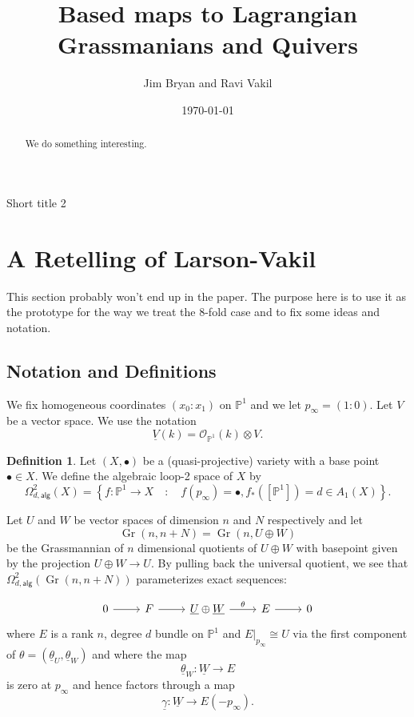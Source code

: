 \documentclass{amsart}
\title{Based maps to Lagrangian Grassmanians and Quivers}
\author{Jim Bryan and Ravi Vakil}
\date{\today}
\theoremstyle{definition}
\newtheorem{definition}[theorem]{Definition}
\newcommand{\PP}{\mathbb{P}}
\newcommand{\OO}{\mathcal{O}}
\newcommand{\UL}[1]{\underline{#1}}
\newcommand{\alg}{\mathsf{alg}}
\newcommand{\Gr}{\operatorname{Gr}}
\newcommand{\LoopTwo}{\Omega^{2}_{d,\alg}}
\begin{document}
\begin{abstract}
We do something interesting. 
\end{abstract}

\maketitle 

  {Short title 2}




\section{A Retelling of Larson-Vakil}

This section probably won't end up in the paper. The purpose here is
to use it as the prototype for the way we treat the 8-fold case and to
fix some ideas and notation.

\subsection{Notation and Definitions}

We fix homogeneous coordinates $(x_{0}:x_{1})$ on $\PP^{1}$ and we let
$p_{\infty }=(1:0)$. Let $V$ be a vector space. We use the notation
\[
\UL{V}(k) = \OO_{\PP^{1}}(k)\otimes V.
\]

\begin{definition}\label{defn: Omega2alg}
Let $(X,\bullet )$ be a (quasi-projective) variety with a base point
$\bullet \in X$. We define the algebraic loop-2 space of $X$ by
\[
\LoopTwo (X) = \left\{f:\PP^{1}\to X \quad :\quad
f(p_{\infty})=\bullet , f_{*}([\PP^{1}])=d\in A_{1}(X) \right\}.
\]
\end{definition}


Let $U$ and $W$ be vector spaces of dimension $n$ and $N$ respectively
and let
\[
\Gr (n,n+N) = \Gr (n,U\oplus W)
\]
be the Grassmannian of $n$ dimensional quotients of $U\oplus W$ with
basepoint given by the projection $U\oplus W\to U$. By pulling back
the universal quotient, we see that $\LoopTwo (\Gr (n,n+N))$
parameterizes exact sequences:

\[
\begin{tikzcd}
0\arrow[r]& F \arrow[r]& \UL{U}\oplus \UL{W} \arrow{r}{\theta } &E
\arrow[r]& 0
\end{tikzcd}
\]
where $E$ is a rank $n$, degree $d$ bundle on $\PP^{1}$ and
$E|_{p_{\infty}}\cong U$ via the first component of $\theta
=({\UL{\theta}_U},\UL{\theta}_{W})$ and where the map
\[
\UL{\theta }_{{W}}:\UL{W}\to E
\]
is zero at $p_{\infty}$ and hence
factors through a map
\[
\UL{\gamma} :\UL{W} \to E(-p_{\infty}).
\]
\end{document}
